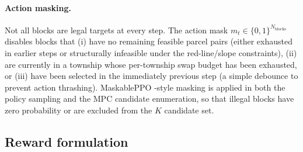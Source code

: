 \documentclass[11pt]{article}
\begin{document}
\paragraph{Action masking.}
Not all blocks are legal targets at every step. The action mask $m_t \in \{0, 1\}^{N_{\text{blocks}}}$ disables blocks that (i) have no remaining feasible parcel pairs (either exhausted in earlier steps or structurally infeasible under the red-line/slope constraints), (ii) are currently in a township whose per-township swap budget has been exhausted, or (iii) have been selected in the immediately previous step (a simple debounce to prevent action thrashing). MaskablePPO \citep{ross2011reduction,schulman2017proximal,huang2022maskable}-style masking is applied in both the policy sampling and the MPC candidate enumeration, so that illegal blocks have zero probability or are excluded from the $K$ candidate set.

\subsection*{Reward formulation}\label{sec:methods-reward}
\end{document}
